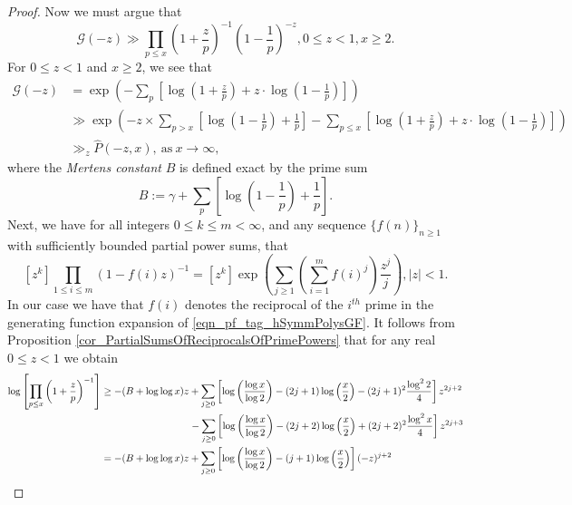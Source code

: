 \documentclass[11pt,reqno,a4letter]{article}
\numberwithin{figure}{section}
\numberwithin{table}{section}
\theoremstyle{plain}
\numberwithin{theorem}{section}
\theoremstyle{definition}
\begin{document}
\begin{proof}
Now we must argue that 
\[
\mathcal{G}(-z) \gg \prod_{p \leq x} \left(1 + \frac{z}{p}\right)^{-1} 
     \left(1 - \frac{1}{p}\right)^{-z}, 0 \leq z < 1, x \geq 2. 
\]
For $0 \leq z < 1$ and $x \geq 2$, we see that 
\begin{align*} 
\mathcal{G}(-z) & = \exp\left(-\sum_p \left[\log\left(1 + \frac{z}{p}\right) + 
     z \cdot \log\left(1 - \frac{1}{p}\right)\right]\right) \\ 
     & \gg 
     \exp\left(-z \times \sum_{p > x} \left[
     \log\left(1 - \frac{1}{p}\right) + \frac{1}{p}\right] - 
     \sum_{p \leq x} \left[\log\left(1 + \frac{z}{p}\right) + 
     z \cdot \log\left(1 - \frac{1}{p}\right)\right]\right) \\ 
     & \gg_z \widehat{P}(-z, x), \mathrm{\ as\ } x \rightarrow \infty, 
\end{align*} 
where the \emph{Mertens constant} $B$ is defined exact by the prime sum 
\cite[\S 22.8]{HARDYWRIGHT} 
\[
B := \gamma + \sum_p \left[\log\left(1-\frac{1}{p}\right) + \frac{1}{p}\right]. 
\]
Next, we have for all integers $0 \leq k \leq m < \infty$, and any sequence 
$\{f(n)\}_{n \geq 1}$ with sufficiently bounded partial power sums, that 
\cite[\S 2]{MACDONALD-SYMFUNCS} 
\begin{equation} 
\label{eqn_pf_tag_hSymmPolysGF} 
[z^k] \prod_{1 \leq i \leq m} (1-f(i) z)^{-1} = [z^k] \exp\left(\sum_{j \geq 1} 
     \left(\sum_{i=1}^m f(i)^j\right) \frac{z^j}{j}\right), |z| < 1. 
\end{equation} 
In our case we have that $f(i)$ denotes the reciprocal of the 
$i^{th}$ prime in the generating function expansion of 
\eqref{eqn_pf_tag_hSymmPolysGF}. 
It follows from Proposition \ref{cor_PartialSumsOfReciprocalsOfPrimePowers} that 
for any real $0 \leq z < 1$ we obtain 
\begin{align} 
\notag 
\log\left[\prod_{p \leq x} \left(1+\frac{z}{p}\right)^{-1}\right] & \geq -(B + \log\log x) z + 
     \sum_{j \geq 0} \left[\log\left(\frac{\log x}{\log 2}\right) - 
     (2j+1) \log\left(\frac{x}{2}\right) - (2j+1)^2 \frac{\log^2 2}{4}\right] z^{2j+2} \\ 
\notag 
     & \phantom{\geq -(B + \log\log x) z\ } - 
     \sum_{j \geq 0} \left[\log\left(\frac{\log x}{\log 2}\right) - 
     (2j+2) \log\left(\frac{x}{2}\right) + (2j+2)^2 \frac{\log^2 x}{4}\right] z^{2j+3} \\ 
\notag 
     & = -(B + \log\log x) z + \sum_{j \geq 0} \left[ 
     \log\left(\frac{\log x}{\log 2}\right) - 
     (j+1) \log\left(\frac{x}{2}\right)\right] (-z)^{j+2} \\ 

\end{align}
\end{proof}
\end{document}
